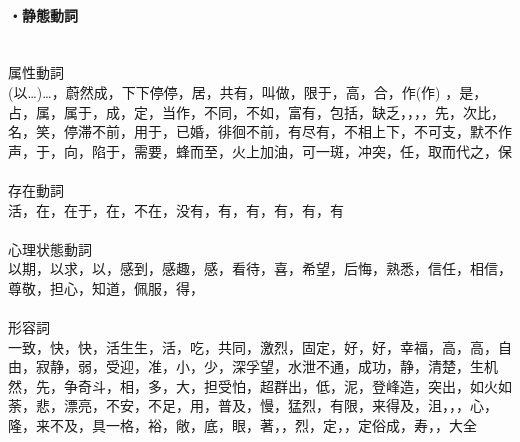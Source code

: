 \paragraph{・静態動詞}　\\
属性動詞\\
(以…)…，蔚然成，下下停停，居，共有，叫做，限于，高，合，作(作) ，是，占，属，属于，成，定，当作，不同，不如，富有，包括，缺乏，，，，先，次比，名，笑，停滞不前，用于，已婚，徘徊不前，有尽有，不相上下，不可支，默不作声，于，向，陷于，需要，蜂而至，火上加油，可一斑，冲突，任，取而代之，保\\
\\
存在動詞\\
活，在，在于，在，不在，没有，有，有，有，有，有\\
\\
心理状態動詞\\
以期，以求，以，感到，感趣，感，看待，喜，希望，后悔，熟悉，信任，相信，尊敬，担心，知道，佩服，得，\\
\\
形容詞\\
一致，快，快，活生生，活，吃，共同，激烈，固定，好，好，幸福，高，高，自由，寂静，弱，受迎，准，小，少，深孚望，水泄不通，成功，静，清楚，生机然，先，争奇斗，相，多，大，担受怕，超群出，低，泥，登峰造，突出，如火如荼，悲，漂亮，不安，不足，用，普及，慢，猛烈，有限，来得及，沮，，，心，隆，来不及，具一格，裕，敞，底，眼，著，，烈，定，，定俗成，寿，，大全

